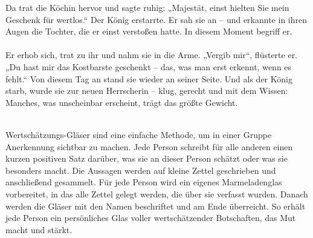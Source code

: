 Da trat die Köchin hervor und sagte ruhig:
„Majestät, einst hielten Sie mein Geschenk für wertlos.“
Der König erstarrte. Er sah sie an – und erkannte in ihren Augen die Tochter, die er einst verstoßen hatte. In diesem Moment begriff er.\\ \\
Er erhob sich, trat zu ihr und nahm sie in die Arme.
„Vergib mir“, flüsterte er. „Du hast mir das Kostbarste geschenkt – das, was man erst erkennt, wenn es fehlt.“
Von diesem Tag an stand sie wieder an seiner Seite. Und als der König starb, wurde sie zur neuen Herrscherin – klug, gerecht und mit dem Wissen: Manches, was unscheinbar erscheint, trägt das größte Gewicht.\\ \\


Wertschätzungs-Gläser sind eine einfache Methode, um in einer Gruppe Anerkennung sichtbar zu machen. Jede Person schreibt für alle anderen einen kurzen positiven Satz darüber, was sie an dieser Person schätzt oder was sie besonders macht. Die Aussagen werden auf kleine Zettel geschrieben und anschließend gesammelt. Für jede Person wird ein eigenes Marmeladenglas vorbereitet, in das alle Zettel gelegt werden, die über sie verfasst wurden. Danach werden die Gläser mit den Namen beschriftet und am Ende überreicht. So erhält jede Person ein persönliches Glas voller wertschätzender Botschaften, das Mut macht und stärkt.
